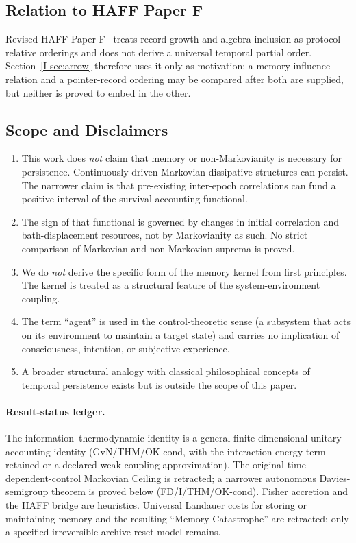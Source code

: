 \documentclass[12pt,a4paper,openany]{book}
\begin{document}
\subsection{Relation to HAFF Paper F}

Revised HAFF Paper F~\cite{Liu2026HAFF_F} treats record growth and
algebra inclusion as protocol-relative orderings and does not derive
a universal temporal partial order.  Section~\ref{I-sec:arrow} therefore
uses it only as motivation: a memory-influence relation and a
pointer-record ordering may be compared after both are supplied, but
neither is proved to embed in the other.

\subsection{Scope and Disclaimers}

\begin{enumerate}
\item This work does \emph{not} claim that memory or
  non-Markovianity is necessary for persistence.  Continuously driven
  Markovian dissipative structures can persist.  The narrower claim is
  that pre-existing inter-epoch correlations can fund a positive
  interval of the survival accounting functional.
\item The sign of that functional is governed by changes in initial
  correlation and bath-displacement resources, not by Markovianity as
  such.  No strict comparison of Markovian and non-Markovian suprema is
  proved.
\item We do \emph{not} derive the specific form of the memory
  kernel from first principles. The kernel is treated as a
  structural feature of the system-environment coupling.
\item The term ``agent'' is used in the control-theoretic sense
  (a subsystem that acts on its environment to maintain a target
  state) and carries no implication of consciousness, intention,
  or subjective experience.
\item A broader structural analogy with classical philosophical
  concepts of temporal persistence exists but is outside the
  scope of this paper.
\end{enumerate}

\paragraph{Result-status ledger.}
The information--thermodynamic identity is a general finite-dimensional
unitary accounting identity (GvN/THM/OK-cond, with the interaction-energy
term retained or a declared weak-coupling approximation).  The original
time-dependent-control Markovian Ceiling is retracted; a narrower
autonomous Davies-semigroup theorem is proved below (FD/I/THM/OK-cond).
Fisher accretion and the HAFF bridge are heuristics.  Universal
Landauer costs for storing or maintaining memory and the resulting
``Memory Catastrophe'' are retracted; only a specified irreversible
archive-reset model remains.
\end{document}
